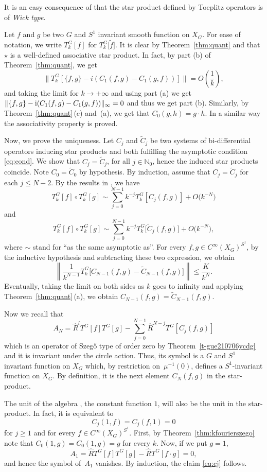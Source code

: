 \documentclass[10pt,a4paper]{amsart}
\numberwithin{equation}{section}
\begin{document}
 	It is an easy consequence of \cite{gh} that the star product defined by Toeplitz operators is of \textit{Wick type}.
 	
 	Let $f$ and $g$ be two $G$ and $S^1$ invariant smooth function on $X_G$. For ease of notation, we write $T^{G}_k[f]$ for $T^{G}_k\big[\widetilde{f}\big]$. It is clear by Theorem~\ref{thm:quant} and \cite{gh} that $\star$ is a well-defined associative star product. In fact, by part (b) of Theorem~\ref{thm:quant}, we get
 	\[\big\lVert T^{G}_k[{\{f, g\}-i(C_1(f,g)-C_1(g,f))}] \big\rVert=O\left(\frac{1}{k}\right), \]
 	and taking the limit for $k\rightarrow+\infty$ and using part (a) we get
$\lVert \{f, g\}-{\rm i}(C_1(f,g)-C_1(g,f))\rVert_{\infty}=0 $
 	and thus we get part (b). Similarly, by Theorem~\ref{thm:quant}\,(c) and~(a), we get that $C_0(g,h)=g\cdot h$. In a similar way the associativity property is proved. 	
 	
 	Now, we prove the uniqueness. Let $C_j$ and $\tilde{C}_j$ be two systems of bi-differential operators inducing star products and both fulfilling the asymptotic condition \eqref{eq:cond}. We show that $C_j = \tilde{C}_j$, for all $j\in \mathbb{N}_0$, hence the induced star products coincide. Note $C_0=\tilde{C}_0$ by hypothesis. By induction, assume that $C_j=\tilde{C}_j$ for each $j\leq N-2$. By the results in \cite{gh}, we have
 	\[T_k^G[f]\circ T_k^G[g]\sim\sum_{j=0}^{N-1}k^{-j}T_k^G[C_j(f, g)] +O\bigl(k^{-N}\bigr)\]
 	and
 	\[T_k^G[f]\circ T_k^G[g]\sim\sum_{j=0}^{N-1}k^{-j}T_k^G\big[\tilde{C}_j(f, g)\big]+O\bigl(k^{-N}\bigr) , \]
 	where $\sim$ stand for ``as the same asymptotic as''. For every $f, g\in C^{\infty}(X_G)^{S^1}$, by the inductive hypothesis and subtracting these two expression, we obtain
 	\[\left\lVert \frac{1}{k^{N-1}} T^G_k\big[{C}_{N-1}(f, g)-\tilde{C}_{N-1}(f, g)\big]\right\rVert\leq \frac{K}{k^{N}} . \]
 	Eventually, taking the limit on both sides as $k$ goes to infinity and applying Theorem~\ref{thm:quant}\,(a), we obtain
 	$C_{N-1}(f, g)=\tilde{C}_{N-1}(f, g) $.
 	
 	Now we recall that
 	\[A_N=\hat{R}^lT^G[f]T^G[g]-\sum_{j=0}^{N-1} \hat{R}^{N-j}T^G[C_j(f, g)] \]
 	which is an operator of Szeg\H{o} type of order zero by Theorem~\ref{t-gue210706ycdg} and it is invariant under the circle action. Thus, its symbol is a $G$ and $S^1$ invariant function on $X_G$ which, by restriction on~$\mu^{-1}(0)$, defines a $S^1$-invariant function on $X_G$. By definition, it is the next element $C_N(f, g)$ in the star-product.
 	
 	The unit of the algebra , the constant function $1$, will also be the unit in the star-product. In fact, it is equivalent to
 	\begin{equation} \label{eq:cj}
 		C_j(1, f)=C_j(f, 1)=0
 		\end{equation}
 	for $j\geq 1$ and for every $f\in C^{\infty}(X_G)^{S^1}$. First, by Theorem~\ref{thm:kfourierszego} note that
 	$ C_0(1, g)=C_0(1, g)=g$
 	for every $k$. 	Now, if we put $g=1$,{\samepage
\[
A_1= \hat{R}T^G[f]T^G[g]-\hat{R}T^G[f\cdot g]= 0,
\]
 	and hence the symbol of~$A_1$ vanishes. By induction, the claim \eqref{eq:cj} follows.}
 	
\end{document}
